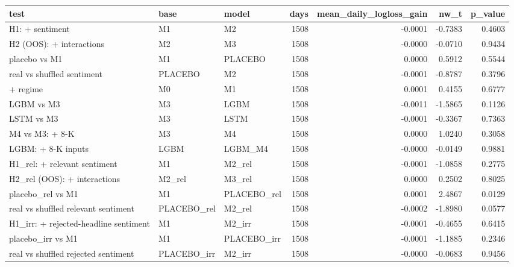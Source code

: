 \begin{tabular}{lllrrrr}
\toprule
test & base & model & days & mean\_daily\_logloss\_gain & nw\_t & p\_value \\
\midrule
H1: + sentiment & M1 & M2 & 1508 & -0.0001 & -0.7383 & 0.4603 \\
H2 (OOS): + interactions & M2 & M3 & 1508 & -0.0000 & -0.0710 & 0.9434 \\
placebo vs M1 & M1 & PLACEBO & 1508 & 0.0000 & 0.5912 & 0.5544 \\
real vs shuffled sentiment & PLACEBO & M2 & 1508 & -0.0001 & -0.8787 & 0.3796 \\
+ regime & M0 & M1 & 1508 & 0.0001 & 0.4155 & 0.6777 \\
LGBM vs M3 & M3 & LGBM & 1508 & -0.0011 & -1.5865 & 0.1126 \\
LSTM vs M3 & M3 & LSTM & 1508 & -0.0001 & -0.3367 & 0.7363 \\
M4 vs M3: + 8-K & M3 & M4 & 1508 & 0.0000 & 1.0240 & 0.3058 \\
LGBM: + 8-K inputs & LGBM & LGBM\_M4 & 1508 & -0.0000 & -0.0149 & 0.9881 \\
H1\_rel: + relevant sentiment & M1 & M2\_rel & 1508 & -0.0001 & -1.0858 & 0.2775 \\
H2\_rel (OOS): + interactions & M2\_rel & M3\_rel & 1508 & 0.0000 & 0.2502 & 0.8025 \\
placebo\_rel vs M1 & M1 & PLACEBO\_rel & 1508 & 0.0001 & 2.4867 & 0.0129 \\
real vs shuffled relevant sentiment & PLACEBO\_rel & M2\_rel & 1508 & -0.0002 & -1.8980 & 0.0577 \\
H1\_irr: + rejected-headline sentiment & M1 & M2\_irr & 1508 & -0.0001 & -0.4655 & 0.6415 \\
placebo\_irr vs M1 & M1 & PLACEBO\_irr & 1508 & -0.0001 & -1.1885 & 0.2346 \\
real vs shuffled rejected sentiment & PLACEBO\_irr & M2\_irr & 1508 & -0.0000 & -0.0683 & 0.9456 \\
\bottomrule
\end{tabular}
